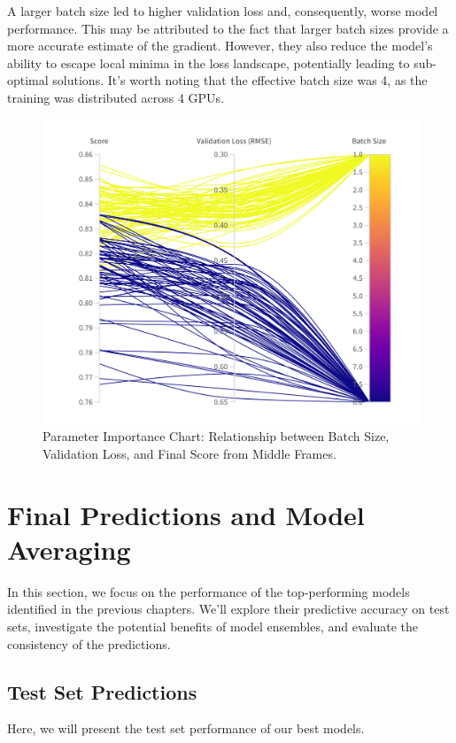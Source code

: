 \documentclass[a4paper,12pt,openright]{book}
\begin{document}
A larger batch size led to higher validation loss and, consequently, worse model performance. This may be attributed to the fact that larger batch sizes provide a more accurate estimate of the gradient. However, they also reduce the model's ability to escape local minima in the loss landscape, potentially leading to sub-optimal solutions. It's worth noting that the effective batch size was 4, as the training was distributed across 4 GPUs.






\begin{figure}[H]
\centering
\includegraphics[trim={1cm 2cm 1cm 2cm},clip,width=1.0\textwidth]{images/W&B Chart 03_09_2023, 16_16_33 (1).png}
\caption{Parameter Importance Chart: Relationship between Batch Size, Validation Loss, and Final Score from Middle Frames.}
\label{fig:BatchSize}
\end{figure}

\section{Final Predictions and Model Averaging}
In this section, we focus on the performance of the top-performing models identified in the previous chapters. We'll explore their predictive accuracy on test sets, investigate the potential benefits of model ensembles, and evaluate the consistency of the predictions.

\subsection{Test Set Predictions}
Here, we will present the test set performance of our best models.
\end{document}
